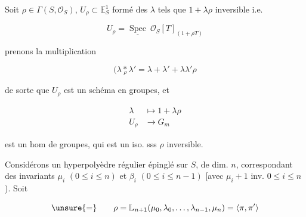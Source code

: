 Soit $\rho\in\Gamma(S,\mathcal O_S)$, $U_\rho\subset\mathbb E^{1}_{S}$ formé des $\lambda$ tels que $1+\lambda\rho$ inversible i.e.

\[
U_\rho=\underline{\operatorname{Spec}}\ \mathcal O_S[T]_{(1+\rho T)}
\]

prenons la multiplication

\[
(\lambda\mathbin{\underset{\rho}{*}}\lambda'=\lambda+\lambda'+\lambda\lambda'\rho
\]

de sorte que $U_\rho$ est un schéma en groupes, et

\[
\begin{aligned}
\lambda&\mapsto 1+\lambda\rho\\
U_\rho&\longrightarrow G_m
\end{aligned}
\]

est un hom de groupes, qui est un iso. sss $\rho$ inversible.

Considérons un hyperpolyèdre régulier  épinglé sur $S$, de dim. $n$, correspondant  des invariants $\mu_i$ $(0\leq i\leq n)$ et $\beta_i$ $(0\leq i\leq n-1)$ [avec $\mu_i+1$ inv. $0\leq i\leq n$). Soit 

\[
\unsure{=}\qquad \rho=\mathbb L_{n+1}(\mu_0,\lambda_0,\ldots,\lambda_{n-1},\mu_n)=\langle\pi,\pi'\rangle
\]

